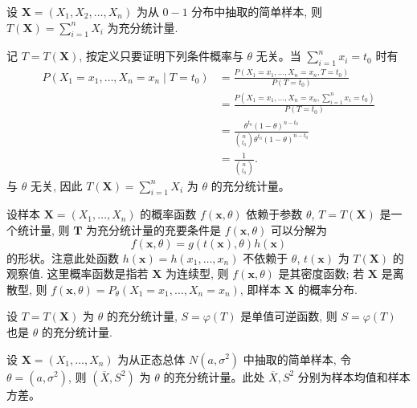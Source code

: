 \begin{example}
\label{ex:bernoulli_sum_sufficient}
设 $\boldsymbol{X} = (X_1, X_2, \ldots, X_n)$ 为从 $0-1$ 分布中抽取的简单样本, 则 $T(\boldsymbol{X}) = \sum_{i=1}^n X_i$ 为充分统计量.

记 $T=T(\boldsymbol{X})$, 按定义只要证明下列条件概率与 $\theta$ 无关。当 $\sum_{i=1}^n x_i = t_0$ 时有
\begin{align*}
P(X_1 = x_1, \ldots, X_n = x_n \mid T = t_0) &= \frac{P(X_1 = x_1, \ldots, X_n = x_n, T = t_0)}{P(T = t_0)} \\
&= \frac{P\left(X_1 = x_1, \ldots, X_n = x_n, \sum_{i=1}^n x_i = t_0\right)}{P(T = t_0)} \\
&= \frac{\theta^{t_0}(1-\theta)^{n-t_0}}{\binom{n}{t_0}\theta^{t_0}(1-\theta)^{n-t_0}}\\
&= \frac{1}{\binom{n}{t_0}}.
\end{align*}
与 $\theta$ 无关, 因此 $T(\boldsymbol{X}) = \sum_{i=1}^n X_i$ 为 $\theta$ 的充分统计量。
\end{example}

\begin{theorem}[因子分解定理] \label{thm:factorization_theorem}
设样本 $\boldsymbol{X} = (X_1,\ldots,X_n)$ 的概率函数 $f(\boldsymbol{x},\theta)$ 依赖于参数 $\theta$, $T=T(\boldsymbol{X})$ 是一个统计量, 则 $\boldsymbol{T}$ 为充分统计量的充要条件是 $f(\boldsymbol{x},\theta)$ 可以分解为
\begin{equation} \label{eq:factorization_formula}
f(\boldsymbol{x},\theta) = g(t(\boldsymbol{x}),\theta)h(\boldsymbol{x})
\end{equation}
的形状。注意此处函数 $h(\boldsymbol{x})=h(x_1,\ldots,x_n)$ 不依赖于 $\theta$, $t(\boldsymbol{x})$ 为 $T(\boldsymbol{X})$ 的观察值.
这里概率函数是指若 $\boldsymbol{X}$ 为连续型, 则 $f(\boldsymbol{x},\theta)$ 是其密度函数; 若 $\boldsymbol{X}$ 是离散型, 则 $f(\boldsymbol{x},\theta) = P_\theta(X_1=x_1, \ldots, X_n=x_n)$, 即样本 $\boldsymbol{X}$ 的概率分布.
\end{theorem}
\begin{corollary}\label{cor:function_of_sufficient_statistic}
设 $T=T(\boldsymbol{X})$ 为 $\theta$ 的充分统计量, $S=\varphi(T)$ 是单值可逆函数, 则 $S=\varphi(T)$ 也是 $\theta$ 的充分统计量.
\end{corollary}

\begin{example} \label{ex:normal_mean_variance_sufficient}
设 $\boldsymbol{X} = (X_1, \ldots, X_n)$ 为从正态总体 $N(a,\sigma^2)$ 中抽取的简单样本, 令 $\theta = (a,\sigma^2)$, 则 $(\overline{X}, S^2)$ 为 $\theta$ 的充分统计量。此处 $\overline{X}, S^2$ 分别为样本均值和样本方差。
\end{example}

